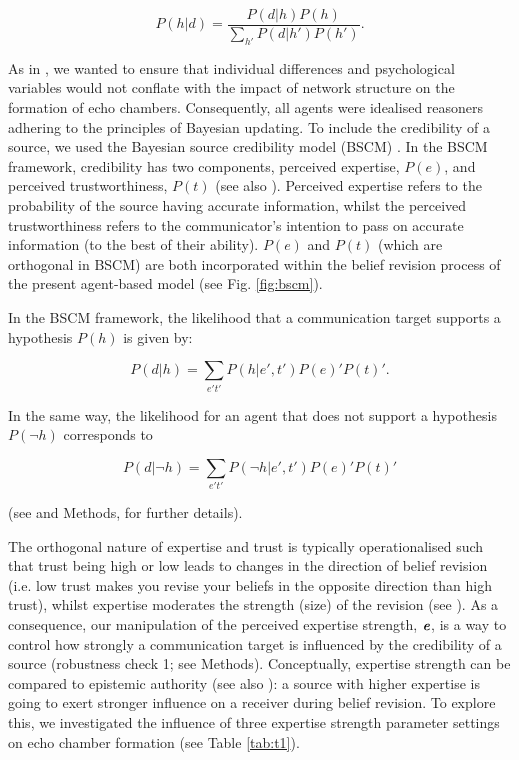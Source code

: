 \documentclass[fleqn,10pt]{wlscirep}
\begin{document}
\begin{equation}
    P(h|d) = \frac{P(d|h)P(h)}{\sum_{h'}P(d|h')P(h')}.
\end{equation}

As in \cite{madsen2017growing, madsen2018large}, we wanted to ensure that individual differences and psychological variables would not conflate with the impact of network structure on the formation of echo chambers. Consequently, all agents were idealised reasoners adhering to the principles of Bayesian updating. To include the credibility of a source, we used the Bayesian source credibility model (BSCM) \cite{bovens2003bayesian, hahn2009argument, harris2009bayesian}. In the BSCM framework, credibility has two components, perceived expertise, \(P(e)\), and perceived trustworthiness, \(P(t)\) (see also \cite{harris2016appeal}). Perceived expertise refers to the probability of the source having accurate information, whilst the perceived trustworthiness refers to the communicator's intention to pass on accurate information (to the best of their ability). \(P(e)\) and \(P(t)\) (which are orthogonal in BSCM) are both incorporated within the belief revision process of the present agent-based model (see Fig. \ref{fig:bscm}).

In the BSCM framework, the likelihood that a communication target supports a hypothesis \(P(h)\) is given by:  

\begin{equation}
    P(d|h) = \sum_{e't'}P(h|e',t')P(e)'P(t)'. 
\end{equation}

In the same way, the likelihood for an agent that does not support a hypothesis \(P(\neg h)\) corresponds to
   
\begin{equation}
    P(d|\neg h) = \sum_{e't'}P(\neg h|e',t')P(e)'P(t)' 
\end{equation}

(see \cite{hahn2009argument, harris2016appeal} and Methods, for further details).  

The orthogonal nature of expertise and trust is typically operationalised such that trust being high or low leads to changes in the direction of belief revision (i.e. low trust makes you revise your beliefs in the opposite direction than high trust), whilst expertise moderates the strength (size) of the revision (see  \cite{bovens2003bayesian, harris2016appeal}). As a consequence, our manipulation of the perceived expertise strength, \(\textbf{\emph{e}}\), is a way to control how strongly a communication target is influenced by the credibility of a source (robustness check 1; see Methods). Conceptually, expertise strength can be compared to epistemic authority (see also \cite{walton2010appeal}): a source with higher expertise is going to exert stronger influence on a receiver during belief revision. To explore this, we investigated the influence of three expertise strength parameter settings on echo chamber formation (see Table \ref{tab:t1}). 
\end{document}
